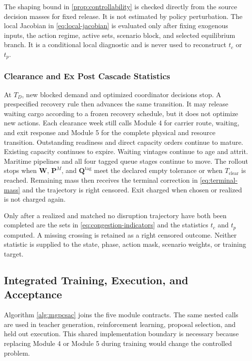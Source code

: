 \documentclass[a4paper,fleqn]{cas-sc}
\begin{document}
The shaping bound in \cref{prop:controllability} is checked directly from the
source decision masses for fixed release. It is not estimated by policy
perturbation. The local Jacobian in \cref{eq:local-jacobian} is evaluated only
after fixing exogenous inputs, the action regime, active sets, scenario block,
and selected equilibrium branch. It is a conditional local diagnostic and is
never used to reconstruct $t_c$ or $t_p$.

\subsubsection{Clearance and Ex Post Cascade Statistics}
At $T_D$, new blocked demand and optimized coordinator decisions stop. A prespecified
recovery rule then advances the same transition. It may release waiting cargo
according to a frozen recovery schedule, but it does not optimize new actions.
Each clearance week still calls Module 4 for carrier route, waiting, and exit
response and Module 5 for the complete physical and resource transition.
Outstanding readiness and direct capacity orders continue to mature. Existing
capacity continues to expire. Waiting vintages continue to age and attrit.
Maritime pipelines and all four tagged queue stages continue to move. The
rollout stops when $\mathbf W$, $\mathbf P^M$, and
$\mathbf Q^{\mathrm{tag}}$ meet the declared empty tolerance or when
$T_{\mathrm{clear}}$ is reached. Remaining mass then receives the terminal
correction in \cref{eq:terminal-mass} and the trajectory is right censored.
Exit charged when chosen or realized is not charged again.

Only after a realized and matched no disruption trajectory have both been
completed are the sets in \cref{eq:congestion-indicators} and the statistics
$t_c$ and $t_p$ computed. A missing crossing is retained as a right censored
outcome. Neither statistic is supplied to the state, phase, action mask,
scenario weights, or training target.

\subsection{Integrated Training, Execution, and Acceptance}
\label{subsec:integrated-algorithm}

Algorithm \ref{alg:mgpcsac} joins the five module contracts. The same nested
calls are used in teacher generation, reinforcement learning, proposal
selection, and held out execution. This shared implementation boundary is
necessary because replacing Module 4 or Module 5 during training would change
the controlled problem.
\end{document}
